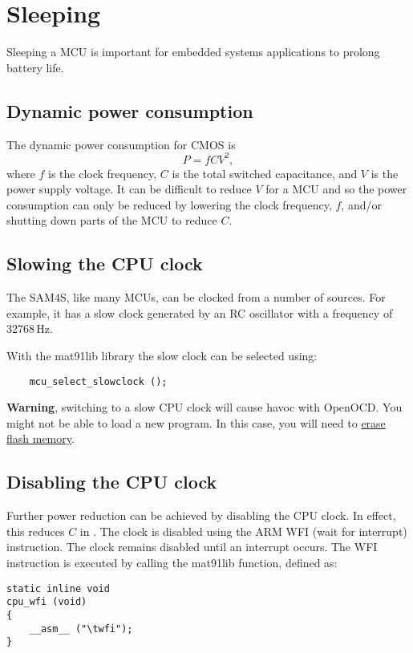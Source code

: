 \chapter{Sleeping}

Sleeping a MCU is important for embedded systems applications to
prolong battery life.


\section{Dynamic power consumption}

The dynamic power consumption for CMOS is
%
\begin{equation}
  P = f C V^2,
  \label{eqn:power}
\end{equation}
%
where $f$ is the clock frequency, $C$ is the total switched
capacitance, and $V$ is the power supply voltage.  It can be difficult
to reduce $V$ for a MCU and so the power consumption can only be
reduced by lowering the clock frequency, $f$, and/or shutting down
parts of the MCU to reduce $C$.


\section{Slowing the CPU clock}

The SAM4S, like many MCUs, can be clocked from a number of sources.
For example, it has a slow clock generated by an RC oscillator with a
frequency of 32768\,Hz.

With the mat91lib library the slow clock can be selected using:
%
\begin{verbatim}
    mcu_select_slowclock ();
\end{verbatim}

\textbf{Warning}, switching to a slow CPU clock will cause havoc with
OpenOCD.  You might not be able to load a new program.  In this case,
you will need to \hyperref[erasing-flash-memory]{erase flash memory}.


\section{Disabling the CPU clock}

Further power reduction can be achieved by disabling the CPU clock.
In effect, this reduces $C$ in .  The clock is disabled
using the ARM WFI (wait for interrupt) instruction.  The clock remains
disabled until an interrupt occurs.  The WFI instruction is executed
by calling the mat91lib  function, defined as:
%
\begin{verbatim}
static inline void
cpu_wfi (void)
{
    __asm__ ("\twfi");
}
\end{verbatim}

